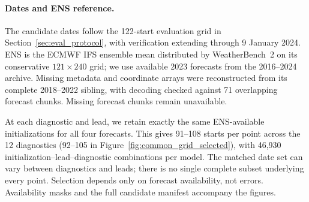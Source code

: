 \documentclass{article}
\newcommand{\vfourchange}[1]{{\color{blue}#1}}
\newif\ifvfivechanges
\begin{document}
\paragraph{\vfourchange{Dates and ENS reference.}}
\ifvfivechanges
\par\begingroup\color{vfiveDeleted}\noindent
\sout{The candidate sample consists of 122 initializations at 00\,UTC every third day from 1 January through 30 December 2023, with verification extending through 9 January 2024. ENS denotes the ECMWF IFS ensemble-mean forecast distributed by WeatherBench~2 on its conservative $121\times240$ grid. We use available 2023 forecasts from the extended 2016--2024 store.}\footnote{\raggedright The ENS stores under \url{gs://weatherbench2/datasets/ifs_ens/} are \path{2016-2024-240x121_equiangular_with_poles_conservative_mean.zarr} (forecast source) and \path{2018-2022-240x121_equiangular_with_poles_conservative_mean.zarr} (layout reference).}\sout{ Missing metadata and coordinate arrays were reconstructed from the complete 2018--2022 sibling store, with decoding checked against 71 overlapping forecast chunks. Missing forecast chunks remain unavailable.}
\par\endgroup
\fi
\vfourchange{The candidate dates follow the 122-start evaluation grid in Section~\ref{sec:eval_protocol}, with verification extending through 9 January 2024. ENS is the ECMWF IFS ensemble mean distributed by WeatherBench~2 on its conservative $121\times240$ grid; we use available 2023 forecasts from the 2016--2024 archive. Missing metadata and coordinate arrays were reconstructed from its complete 2018--2022 sibling, with decoding checked against 71 overlapping forecast chunks. Missing forecast chunks remain unavailable.}

\vfourchange{At each diagnostic and lead, we retain exactly the same ENS-available initializations for all four forecasts. This gives 91--108 starts per point across the 12 diagnostics (92--105 in Figure~\ref{fig:common_grid_selected}), with 46,930 initialization--lead--diagnostic combinations per model. The matched date set can vary between diagnostics and leads; there is no single complete subset underlying every point. Selection depends only on forecast availability, not errors. Availability masks and the full candidate manifest accompany the figures.}
\end{document}
